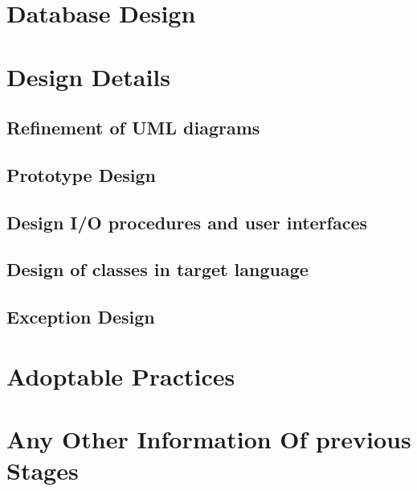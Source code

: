 \documentclass{article}
\begin{document}
\section{Database Design}
\section{Design Details}
\subsection{Refinement of UML diagrams}
\subsection{Prototype Design}
\subsection{Design I/O procedures and user interfaces}
\subsection{Design of classes in target language}
\subsection{Exception Design}
\section{Adoptable Practices}
\section{Any Other Information Of previous Stages}
\end{document}
